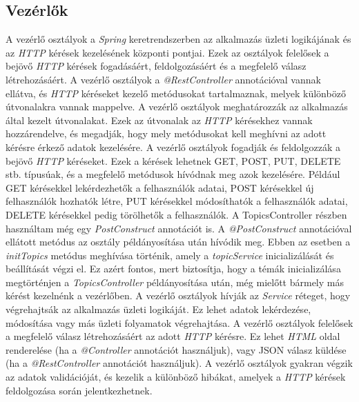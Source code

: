 \subsection{Vezérlők}


A vezérlő osztályok a \textit{Spring} keretrendszerben az alkalmazás üzleti logikájának és az \textit{HTTP} kérések kezelésének központi pontjai. Ezek az osztályok felelősek a bejövő \textit{HTTP} kérések fogadásáért, feldolgozásáért és a megfelelő válasz létrehozásáért. A vezérlő osztályok a \textit{@RestController} annotációval vannak ellátva, és \textit{HTTP} kéréseket kezelő metódusokat tartalmaznak, melyek különböző útvonalakra vannak mappelve. A vezérlő osztályok meghatározzák az alkalmazás által kezelt útvonalakat. Ezek az útvonalak az \textit{HTTP} kérésekhez vannak hozzárendelve, és megadják, hogy mely metódusokat kell meghívni az adott kérésre érkező adatok kezelésére. A vezérlő osztályok fogadják és feldolgozzák a bejövő \textit{HTTP} kéréseket. Ezek a kérések lehetnek GET, POST, PUT, DELETE stb. típusúak, és a megfelelő metódusok hívódnak meg azok kezelésére. Például GET kérésekkel lekérdezhetők a felhasználók adatai, POST kérésekkel új felhasználók hozhatók létre, PUT kérésekkel módosíthatók a felhasználók adatai, DELETE kérésekkel pedig törölhetők a felhasználók. A TopicsController részben használtam még egy \textit{PostConstruct} annotációt is. A \textit{@PostConstruct} annotációval ellátott metódus az osztály példányosítása után hívódik meg. Ebben az esetben a \textit{initTopics} metódus meghívása történik, amely a \textit{topicService} inicializálását és beállítását végzi el. Ez azért fontos, mert biztosítja, hogy a témák inicializálása megtörténjen a \textit{TopicsController} példányosítása után, még mielőtt bármely más kérést kezelnénk a vezérlőben. A vezérlő osztályok hívják az \textit{Service} réteget, hogy végrehajtsák az alkalmazás üzleti logikáját. Ez lehet adatok lekérdezése, módosítása vagy más üzleti folyamatok végrehajtása. A vezérlő osztályok felelősek a megfelelő válasz létrehozásáért az adott \textit{HTTP} kérésre. Ez lehet \textit{HTML} oldal renderelése (ha a \textit{@Controller} annotációt használjuk), vagy JSON válasz küldése (ha a \textit{@RestController} annotációt használjuk). A vezérlő osztályok gyakran végzik az adatok validációját, és kezelik a különböző hibákat, amelyek a \textit{HTTP} kérések feldolgozása során jelentkezhetnek.

